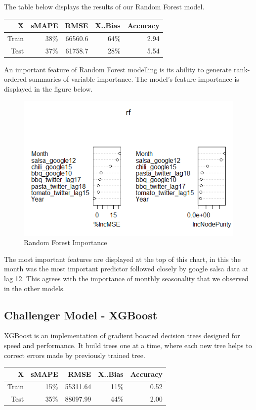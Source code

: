 \documentclass[12pt,oneside]{chicagocapstone}
\begin{document}
The table below displays the results of our Random Forest model.
\begin{longtable}[]{@{}rrrrr@{}}
\toprule
X & sMAPE & RMSE & X..Bias & Accuracy\tabularnewline
\midrule
\endhead
Train & 38\% & 66560.6 & 64\% & 2.94\tabularnewline
Test & 37\% & 61758.7 & 28\% & 5.54\tabularnewline
\bottomrule
\end{longtable}
An important feature of Random Forest modelling is its ability to
generate rank-ordered summaries of variable importance. The model's
feature importance is displayed in the figure below.
\begin{figure}
\centering
\includegraphics{./figure/RF_V_Imp.png}
\caption{Random Forest Importance}
\end{figure}
The most important features are displayed at the top of this chart, in
this the month was the most important predictor followed closely by
google salsa data at lag 12. This agrees with the importance of monthly
seasonality that we observed in the other models.

\subsection*{Challenger Model - XGBoost}\label{findings-XGBoost}

XGBoost is an implementation of gradient boosted decision trees designed
for speed and performance. It build trees one at a time, where each new
tree helps to correct errors made by previously trained tree.
\begin{longtable}[]{@{}rrrrr@{}}
\toprule
X & sMAPE & RMSE & X..Bias & Accuracy\tabularnewline
\midrule
\endhead
Train & 15\% & 55311.64 & 11\% & 0.52\tabularnewline
Test & 35\% & 88097.99 & 44\% & 2.00\tabularnewline
\bottomrule
\end{longtable}
\end{document}
